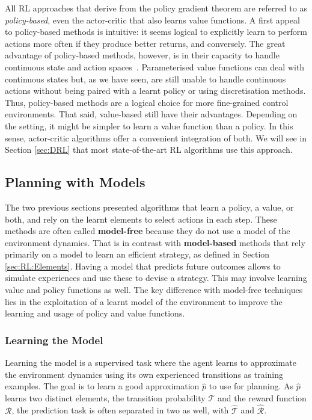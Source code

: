 All RL approaches that derive from the policy gradient theorem are referred to as \textit{policy-based}, even the actor-critic that also learns value functions. A first appeal to policy-based methods is intuitive: it seems logical to explicitly learn to perform actions more often if they produce better returns, and conversely. The great advantage of policy-based methods, however, is in their capacity to handle continuous state and action spaces~\citep{Williams1992_Reinforce}. Parameterised value functions can deal with continuous states but, as we have seen, are still unable to handle continuous actions without being paired with a learnt policy or using discretisation methods. Thus, policy-based methods are a logical choice for more fine-grained control environments. That said, value-based still have their advantages. Depending on the setting, it might be simpler to learn a value function than a policy. In this sense, actor-critic algorithms offer a convenient integration of both. We will see in Section \ref{sec:DRL} that most state-of-the-art RL algorithms use this approach. 






\subsection{Planning with Models}\label{sec:RL:Model-based}

The two previous sections presented algorithms that learn a policy, a value, or both, and rely on the learnt elements to select actions in each step. These methods are often called \textbf{model-free} because they do not use a model of the environment dynamics. That is in contrast with \textbf{model-based} methods that rely primarily on a model to learn an efficient strategy, as defined in Section \ref{sec:RL:Elements}. Having a model that predicts future outcomes allows to simulate experiences and use these to devise a strategy. This may involve learning value and policy functions as well. The key difference with model-free techniques lies in the exploitation of a learnt model of the environment to improve the learning and usage of policy and value functions.

\subsubsection{Learning the Model}
Learning the model is a supervised task where the agent learns to approximate the environment dynamics using its own experienced transitions as training examples. The goal is to learn a good approximation $\widehat{p}$ to use for planning. As $\widehat{p}$ learns two distinct elements, the transition probability $\mathcal{T}$ and the reward function $\mathcal{R}$, the prediction task is often separated in two as well, with $\widehat{\mathcal{T}}$ and $\widehat{\mathcal{R}}$. 

